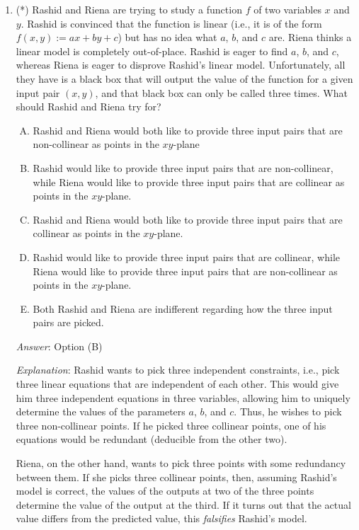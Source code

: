 \documentclass[10pt]{amsart}
\begin{document}
\begin{enumerate}
\item (*) Rashid and Riena are trying to study a function $f$ of two
  variables $x$ and $y$. Rashid is convinced that the function is
  linear (i.e., it is of the form $f(x,y) := ax + by + c$) but has no
  idea what $a$, $b$, and $c$ are. Riena thinks a linear model is
  completely out-of-place. Rashid is eager to find $a$, $b$, and $c$,
  whereas Riena is eager to disprove Rashid's linear
  model. Unfortunately, all they have is a black box that will output
  the value of the function for a given input pair $(x,y)$, and that
  black box can only be called three times. What should Rashid and
  Riena try for?

  \begin{enumerate}[(A)]
  \item Rashid and Riena would both like to provide three input pairs that
    are non-collinear as points in the $xy$-plane
  \item Rashid would like to provide three input pairs that are
    non-collinear, while Riena would like to provide three input pairs
    that are collinear as points in the $xy$-plane.
  \item Rashid and Riena would both like to provide three input pairs
    that are collinear as points in the $xy$-plane.
  \item Rashid would like to provide three input pairs that are
    collinear, while Riena would like to provide three input pairs
    that are non-collinear as points in the $xy$-plane.
  \item Both Rashid and Riena are indifferent regarding how the three
    input pairs are picked.
  \end{enumerate}

  {\em Answer}: Option (B)

  {\em Explanation}: Rashid wants to pick three independent
  constraints, i.e., pick three linear equations that are independent
  of each other. This would give him three independent equations in
  three variables, allowing him to uniquely determine the values of
  the parameters $a$, $b$, and $c$. Thus, he wishes to pick three
  non-collinear points. If he picked three collinear points, one of
  his equations would be redundant (deducible from the other two).

  Riena, on the other hand, wants to pick three points with some
  redundancy between them. If she picks three collinear points, then,
  assuming Rashid's model is correct, the values of the outputs at two
  of the three points determine the value of the output at the
  third. If it turns out that the actual value differs from the
  predicted value, this {\em falsifies} Rashid's model.


\end{enumerate}
\end{document}

